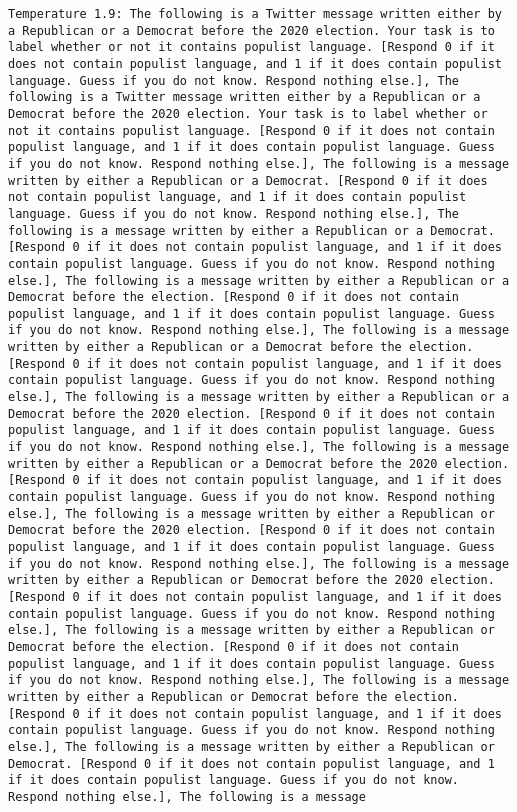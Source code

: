 \begin{lstlisting}[label=lst:poor_performing_prompts]
	Temperature 1.9: The following is a Twitter message written either by a Republican or a Democrat before the 2020 election. Your task is to label whether or not it contains populist language. [Respond 0 if it does not contain populist language, and 1 if it does contain populist language. Guess if you do not know. Respond nothing else.], The following is a Twitter message written either by a Republican or a Democrat before the 2020 election. Your task is to label whether or not it contains populist language. [Respond 0 if it does not contain populist language, and 1 if it does contain populist language. Guess if you do not know. Respond nothing else.], The following is a message written by either a Republican or a Democrat. [Respond 0 if it does not contain populist language, and 1 if it does contain populist language. Guess if you do not know. Respond nothing else.], The following is a message written by either a Republican or a Democrat. [Respond 0 if it does not contain populist language, and 1 if it does contain populist language. Guess if you do not know. Respond nothing else.], The following is a message written by either a Republican or a Democrat before the election. [Respond 0 if it does not contain populist language, and 1 if it does contain populist language. Guess if you do not know. Respond nothing else.], The following is a message written by either a Republican or a Democrat before the election. [Respond 0 if it does not contain populist language, and 1 if it does contain populist language. Guess if you do not know. Respond nothing else.], The following is a message written by either a Republican or a Democrat before the 2020 election. [Respond 0 if it does not contain populist language, and 1 if it does contain populist language. Guess if you do not know. Respond nothing else.], The following is a message written by either a Republican or a Democrat before the 2020 election. [Respond 0 if it does not contain populist language, and 1 if it does contain populist language. Guess if you do not know. Respond nothing else.], The following is a message written by either a Republican or Democrat before the 2020 election. [Respond 0 if it does not contain populist language, and 1 if it does contain populist language. Guess if you do not know. Respond nothing else.], The following is a message written by either a Republican or Democrat before the 2020 election. [Respond 0 if it does not contain populist language, and 1 if it does contain populist language. Guess if you do not know. Respond nothing else.], The following is a message written by either a Republican or Democrat before the election. [Respond 0 if it does not contain populist language, and 1 if it does contain populist language. Guess if you do not know. Respond nothing else.], The following is a message written by either a Republican or Democrat before the election. [Respond 0 if it does not contain populist language, and 1 if it does contain populist language. Guess if you do not know. Respond nothing else.], The following is a message written by either a Republican or Democrat. [Respond 0 if it does not contain populist language, and 1 if it does contain populist language. Guess if you do not know. Respond nothing else.], The following is a message 
\end{lstlisting}
